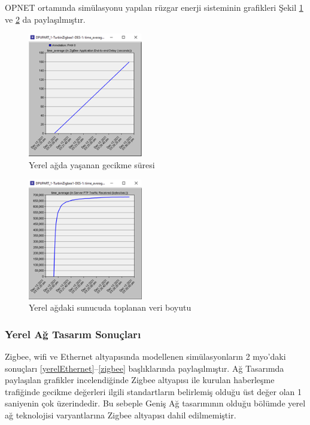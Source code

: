 OPNET ortamında simülasyonu yapılan rüzgar enerji sisteminin grafikleri Şekil \ref{fig:4-25} ve \ref{fig:4-26} da paylaşılmıştır.

\begin{figure}[htbp]
\centerline{\includegraphics[width=5cm]{Resim/sekil4-24.png}}
\caption{Yerel ağda yaşanan gecikme süresi}\label{fig:4-25}
\end{figure}

\begin{figure}[htbp]
\centerline{\includegraphics[width=5cm]{Resim/sekil4-25.png}}
\caption{Yerel ağdaki sunucuda toplanan veri boyutu}
\label{fig:4-26}
\end{figure}



\subsubsection{Yerel Ağ Tasarım Sonuçları}


Zigbee, \gls{wifi} ve Ethernet altyapısında modellenen simülasyonların 2 \gls{myo}'daki sonuçları \ref{yerelEthernet}--\ref{zigbee} başlıklarında paylaşılmıştır. Ağ Tasarımda paylaşılan grafikler incelendiğinde Zigbee altyapısı ile kurulan haberleşme trafiğinde gecikme değerleri ilgili standartların belirlemiş olduğu üst değer olan 1 saniyenin çok üzerindedir. Bu sebeple Geniş Ağ tasarımının olduğu bölümde yerel ağ teknolojisi varyantlarına Zigbee altyapısı dahil edilmemiştir.

